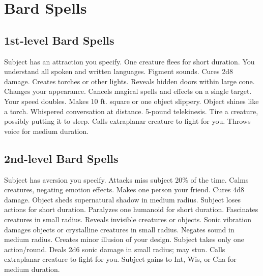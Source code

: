 \small

\section{Bard Spells}

\subsection{1st-level Bard Spells}
\begin{spelllist}
   Subject has an attraction you specify. 
   One creature flees for short duration.
   You understand all spoken and written languages.
   Figment sounds.
   Cures 2d8 damage.
   Creates torches or other lights.
   Reveals hidden doors within large cone.
   Changes your appearance.
   Cancels magical spells and effects on a single target.
   Your speed doubles.
   Makes 10 ft. square or one object slippery.
   Object shines like a torch.
   Whispered conversation at distance.
   5-pound telekinesis.
   Tire a creature, possibly putting it to sleep.
   Calls extraplanar creature to fight for you.
   Throws voice for medium duration.
\end{spelllist}

\subsection{2nd-level Bard Spells}
\begin{spelllist}
   Subject has aversion you specify.
   Attacks miss subject 20\% of the time.
   Calms creatures, negating emotion effects.
   Makes one person your friend. 
   Cures 4d8 damage.
   Object sheds supernatural shadow in medium radius.
   Subject loses actions for short duration.
   Paralyzes one humanoid for short duration.
   Fascinates creatures in small radius.
   Reveals invisible creatures or objects.
   Sonic vibration damages objects or crystalline creatures in small radius.
   Negates sound in medium radius.
   Creates minor illusion of your design.
   Subject takes only one action/round.
   Deals 2d6 sonic damage in small radius; may stun.
   Calls extraplanar creature to fight for you.
   Subject gains  to Int, Wis, or Cha for medium duration.
\end{spelllist}

